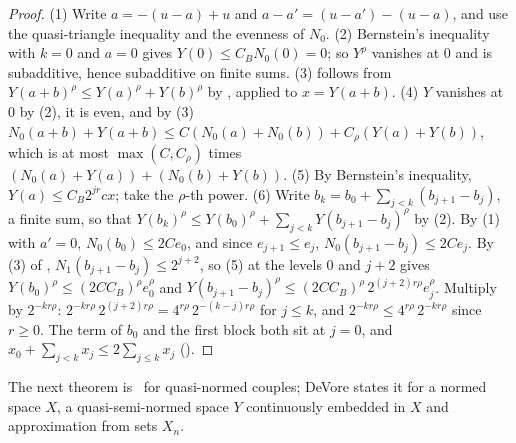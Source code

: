 \begin{proof}
\leanok
{}
(1) Write $a = -(u - a) + u$ and $a - a' = (u - a') - (u - a)$, and use the quasi-triangle
inequality and the evenness of $N_0$. (2) Bernstein's inequality with $k = 0$ and $a = 0$ gives
$Y(0) \leq C_B N_0(0) = 0$; so $Y^\rho$ vanishes at $0$ and is subadditive, hence subadditive on
finite sums. (3) follows from $Y(a + b)^\rho \leq Y(a)^\rho + Y(b)^\rho$ by
, applied to $x = Y(a + b)$. (4) $Y$ vanishes at $0$ by (2), it is
even, and by (3)
$N_0(a + b) + Y(a + b) \leq C (N_0(a) + N_0(b)) + C_\rho (Y(a) + Y(b))$, which is at most
$\max(C, C_\rho)$ times $(N_0(a) + Y(a)) + (N_0(b) + Y(b))$. (5) By Bernstein's inequality,
$Y(a) \leq C_B 2^{jr} c x$; take the $\rho$-th power. (6) Write
$b_k = b_0 + \sum_{j < k} (b_{j+1} - b_j)$, a finite sum, so that
$Y(b_k)^\rho \leq Y(b_0)^\rho + \sum_{j < k} Y(b_{j+1} - b_j)^\rho$ by (2). By (1) with
$a' = 0$, $N_0(b_0) \leq 2 C e_0$, and since $e_{j+1} \leq e_j$,
$N_0(b_{j+1} - b_j) \leq 2 C e_j$. By (3) of ,
$N_1(b_{j+1} - b_j) \leq 2^{j+2}$, so (5) at the levels $0$ and $j + 2$ gives
$Y(b_0)^\rho \leq (2 C C_B)^\rho e_0^\rho$ and
$Y(b_{j+1} - b_j)^\rho \leq (2 C C_B)^\rho \, 2^{(j+2) r \rho} e_j^\rho$. Multiply by
$2^{-kr\rho}$: $2^{-kr\rho} \, 2^{(j+2) r\rho} = 4^{r\rho} \, 2^{-(k-j) r\rho}$ for $j \leq k$,
and $2^{-kr\rho} \leq 4^{r\rho} \, 2^{-kr\rho}$ since $r \geq 0$. The term of $b_0$ and the
first block both sit at $j = 0$, and $x_0 + \sum_{j < k} x_j \leq 2 \sum_{j \leq k} x_j$
().
\end{proof}

The next theorem is~\cite[\S 4.3, Theorem~1]{DeVore1998} for quasi-normed couples; DeVore
states it for a normed space $X$, a quasi-semi-normed space $Y$ continuously embedded in $X$ and
approximation from sets $X_n$.

